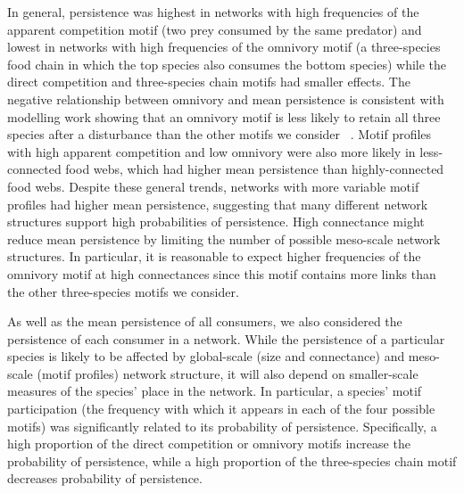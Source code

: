 \documentclass[12pt]{article}
\begin{document}
\begin{spacing}{2.0}
In general, persistence was highest in networks with high frequencies of the apparent competition motif (two prey consumed by the same predator) and lowest in networks with high frequencies of the omnivory motif (a three-species food chain in which the top species also consumes the bottom species) while the direct competition and three-species chain motifs had smaller effects.
The negative relationship between omnivory and mean persistence is consistent with modelling work showing that an omnivory motif is less likely to retain all three species after a disturbance than the other motifs we consider~
\citep{Borrelli2015a}.
Motif profiles with high apparent competition and low omnivory were also more likely in less-connected food webs, which had higher mean persistence than highly-connected food webs.
Despite these general trends, networks with more variable motif profiles had higher mean persistence, suggesting that many different network structures support high probabilities of persistence. 
High connectance might reduce mean persistence by limiting the number of possible meso-scale network structures.
In particular, it is reasonable to expect higher frequencies of the omnivory motif at high connectances since this motif contains more links than the other three-species motifs we consider.


As well as the mean persistence of all consumers, we also considered the persistence of each consumer in a network.
While the persistence of a particular species is likely to be affected by global-scale (size and connectance) and meso-scale (motif profiles) network structure, it will also depend on smaller-scale measures of the species' place in the network.
In particular, a species' motif participation (the frequency with which it appears in each of the four possible motifs) was significantly related to its probability of persistence.
Specifically, a high proportion of the direct competition or omnivory motifs increase the probability of persistence, while a high proportion of the three-species chain motif decreases probability of persistence.



\end{spacing}
\end{document}
